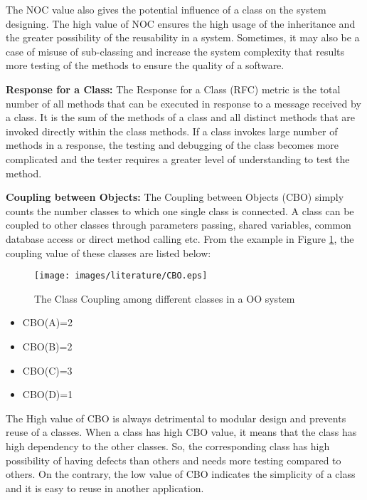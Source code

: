 \documentclass[12pt]{report}
\begin{document}
The NOC value also gives the potential influence of a class on the system designing. The high value of NOC ensures the high usage of the inheritance and the greater possibility of the reusability in a system. Sometimes, it may also be a case of misuse of sub-classing and increase the system complexity that results more testing of the methods to ensure the quality of a software.

\textbf{Response for a Class:} 
The Response for a Class (RFC) metric is the total number of all methods that can be executed in response to a message received by a class. It is the sum of the methods of a class and all distinct methods that are invoked directly within the class methods. If a class invokes large number of methods in a response, the testing and debugging of the class becomes more complicated and  the tester requires a greater level of understanding to test the method. 



\textbf{Coupling between Objects:}
The Coupling between Objects (CBO) simply counts the number classes to which one single class is connected. A class can be coupled to other classes through parameters passing, shared variables, common database access or direct method calling etc. From the example in Figure \ref{CBO_codeMetrics}, the coupling value of these classes are listed below: 
\begin{figure}[h!]
  \centering
    \texttt{[image: images/literature/CBO.eps]}
		\caption{The Class Coupling among different classes in a OO system}
		\label{CBO_codeMetrics}
\end{figure}

\begin{itemize}
	\item CBO(A)=2
	\item CBO(B)=2
	\item CBO(C)=3
	\item CBO(D)=1
\end{itemize}

The High value of CBO is always detrimental to modular design and prevents reuse of a classes. When a class has high CBO value, it means that the class has high dependency to the other classes. So, the corresponding class has high possibility of having defects than others and needs more testing compared to others. On the contrary, the low value of CBO indicates the simplicity of a class and it is easy to reuse in another application. 
\end{document}
